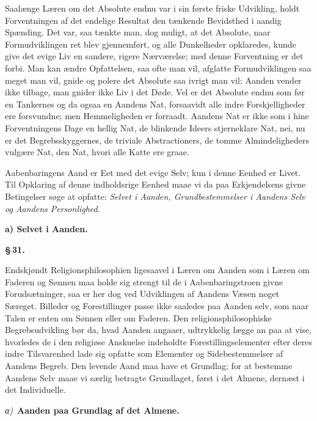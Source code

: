 \documentclass[12pt]{book}
\newcommand{\parmark}[1]{\begin{center}{\bfseries \S\,#1.}\end{center}}
\newcommand{\runhead}[1]{%
  \medskip\begin{center}{\bfseries #1}\end{center}\medskip}
\newcommand{\greekrun}[2]{%
  \medskip\begin{center}{\itshape #1)}\ {\bfseries #2}\end{center}\medskip}
\begin{document}
Saalænge Læren om det Absolute endnu var i sin første friske
Udvikling, holdt Forventningen af det endelige Resultat den tænkende
Bevidsthed i aandig Spænding. Det var, saa tænkte man, dog muligt,
at det Absolute, naar Formudviklingen ret blev gjennemført, og alle
Dunkelheder opklaredes, kunde give det evige Liv en sandere, rigere
Nærværelse; med denne Forventning er det forbi. Man kan ændre
Opfattelsen, saa ofte man vil, afglatte Formudviklingen saa meget
man vil, gnide og polere det Absolute saa ivrigt man vil: Aanden
vender ikke tilbage, man gnider ikke Liv i det Døde. Vel er det
Absolute endnu som før en Tankernes og da ogsaa en Aandens Nat,
forsaavidt alle indre Forskjelligheder ere forsvundne; men
Hemmeligheden er forraadt. Aandens Nat er ikke som i hine
Forventningens Dage en hellig
Nat, de blinkende Ideers stjerneklare Nat, nei, nu er det
Begrebsskyggernes, de triviale Abstractioners, de tomme
Almindeligheders vulgære Nat, den Nat, hvori alle Katte ere graae.

Aabenbaringens Aand er Eet med det evige Selv; kun i denne Eenhed er
Livet. Til Opklaring af denne indholdsrige Eenhed maae vi da paa
Erkjendelsens givne Betingelser søge at opfatte: \emph{Selvet i
Aanden, Grundbestemmelser i Aandens Selv og Aandens Personlighed}.

\runhead{a) Selvet i Aanden.}
\parmark{31}

Endskjøndt Religionsphilosophien ligesaavel i Læren om Aanden som i
Læren om Faderen og Sønnen maa holde sig strengt til de i
Aabenbaringstroen givne Forudsætninger, saa er her dog ved
Udviklingen af Aandens Væsen noget Særeget. Billeder og
Forestillinger passe ikke saaledes paa Aanden selv, som naar Talen
er enten om Sønnen eller om Faderen. Den religionsphilosophiske
Begrebsudvikling bør da, hvad Aanden angaaer, udtrykkelig lægge an
paa at vise, hvorledes de i den religiøse Anskuelse indeholdte
Forestillingselementer efter deres indre Tilsvarenhed lade sig
opfatte som Elementer og Sidebestemmelser af Aandens Begreb. Den
levende Aand maa have et Grundlag; for at bestemme Aandens Selv maae
vi særlig betragte Grundlaget, først i det Almene, dernæst i det
Individuelle.

\greekrun{α}{Aanden paa Grundlag af det Almene.}
\end{document}
